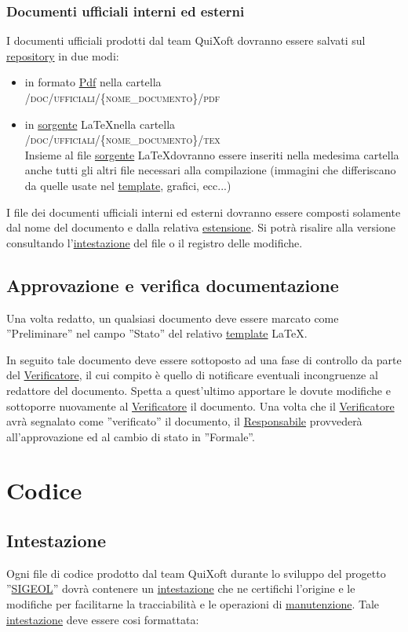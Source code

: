 \documentclass[11pt,a4paper]{article}
\begin{document}
\subsubsection{Documenti ufficiali interni ed esterni}
I documenti ufficiali prodotti dal team QuiXoft dovranno essere salvati sul \underline{repository} in due modi:
\begin{itemize}
	\item in formato \underline{Pdf} nella cartella 
\\ \textsc{/doc/ufficiali/\{nome\_documento\}/pdf}
	\item in \underline{sorgente} \LaTeX \space nella cartella 
\\ \textsc{/doc/ufficiali/\{nome\_documento\}/tex}
\\ Insieme al file \underline{sorgente} \LaTeX \space dovranno essere inseriti nella medesima cartella anche tutti gli altri file necessari alla compilazione (immagini che differiscano da quelle usate nel \underline{template}, grafici, ecc...)
\end{itemize}
I file dei documenti ufficiali interni ed esterni dovranno essere composti solamente dal nome del documento e dalla relativa \underline{estensione}. Si potrà risalire alla versione consultando l'\underline{intestazione} del file o il registro delle modifiche.
\subsection{Approvazione e verifica documentazione}
Una volta redatto, un qualsiasi documento deve essere marcato come ''Preliminare'' nel campo ''Stato'' del relativo \underline{template} \LaTeX.

In seguito tale documento deve essere sottoposto ad una fase di controllo da parte del \underline{Verificatore}, il cui compito è quello di notificare eventuali incongruenze al redattore del documento.
Spetta a quest'ultimo apportare le dovute modifiche e sottoporre nuovamente al \underline{Verificatore} il documento.
Una volta che il \underline{Verificatore} avrà segnalato come ''verificato'' il documento, il \underline{Responsabile} provvederà all'approvazione ed al cambio di stato in ''Formale''.
\section{Codice}
\subsection{Intestazione}
Ogni file di codice prodotto dal team QuiXoft durante lo sviluppo del progetto ''\underline{SIGEOL}'' dovrà contenere un \underline{intestazione} che ne certifichi l'origine e le modifiche per facilitarne la tracciabilità e le operazioni di \underline{manutenzione}.
Tale \underline{intestazione} deve essere cosi formattata: \\
\end{document}
